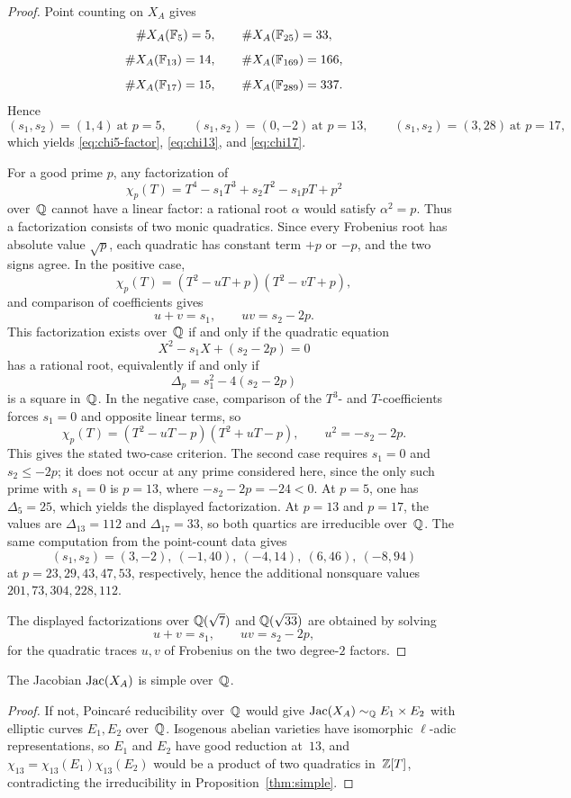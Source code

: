 \begin{proof}
Point counting on \(X_A\) gives
\[
\#X_A(\mathbb{F}_5)=5,\qquad \#X_A(\mathbb{F}_{25})=33,
\]
\[
\#X_A(\mathbb{F}_{13})=14,\qquad \#X_A(\mathbb{F}_{169})=166,
\]
\[
\#X_A(\mathbb{F}_{17})=15,\qquad \#X_A(\mathbb{F}_{289})=337.
\]
Hence
\[
(s_1,s_2)=(1,4)\ \text{at }p=5,\qquad
(s_1,s_2)=(0,-2)\ \text{at }p=13,\qquad
(s_1,s_2)=(3,28)\ \text{at }p=17,
\]
which yields \eqref{eq:chi5-factor}, \eqref{eq:chi13}, and \eqref{eq:chi17}.

For a good prime \(p\), any factorization of
\[
\chi_p(T)=T^4-s_1T^3+s_2T^2-s_1pT+p^2
\]
over~\(\mathbb{Q}\) cannot have a linear factor: a rational root \(\alpha\) would satisfy \(\alpha^2=p\). Thus a factorization consists of two monic quadratics. Since every Frobenius root has absolute value \(\sqrt p\), each quadratic has constant term \(+p\) or \(-p\), and the two signs agree. In the positive case,
\[
\chi_p(T)=(T^2-uT+p)(T^2-vT+p),
\]
and comparison of coefficients gives
\[
u+v=s_1,\qquad uv=s_2-2p.
\]
This factorization exists over~\(\mathbb{Q}\) if and only if the quadratic equation
\[
X^2-s_1X+(s_2-2p)=0
\]
has a rational root, equivalently if and only if
\[
\Delta_p=s_1^2-4(s_2-2p)
\]
is a square in~\(\mathbb{Q}\). In the negative case, comparison of the \(T^3\)- and \(T\)-coefficients forces \(s_1=0\) and opposite linear terms, so
\[
\chi_p(T)=(T^2-uT-p)(T^2+uT-p),\qquad u^2=-s_2-2p.
\]
This gives the stated two-case criterion. The second case requires \(s_1=0\) and \(s_2\leq-2p\); it does not occur at any prime considered here, since the only such prime with \(s_1=0\) is \(p=13\), where \(-s_2-2p=-24<0\). At \(p=5\), one has \(\Delta_5=25\), which yields the displayed factorization. At \(p=13\) and \(p=17\), the values are \(\Delta_{13}=112\) and \(\Delta_{17}=33\), so both quartics are irreducible over~\(\mathbb{Q}\). The same computation from the point-count data gives
\[
(s_1,s_2)=(3,-2),\ (-1,40),\ (-4,14),\ (6,46),\ (-8,94)
\]
at \(p=23,29,43,47,53\), respectively, hence the additional nonsquare values \(201,73,304,228,112\).

The displayed factorizations over \(\mathbb{Q}(\sqrt{7})\) and \(\mathbb{Q}(\sqrt{33})\) are obtained by solving
\[
u+v=s_1,\qquad uv=s_2-2p,
\]
for the quadratic traces \(u,v\) of Frobenius on the two degree-\(2\) factors.
\end{proof}

\begin{corollary}\label{cor:q-simple}
The Jacobian \(\operatorname{Jac}(X_A)\) is simple over~\(\mathbb{Q}\).
\end{corollary}

\begin{proof}
If not, Poincar\'e reducibility over~\(\mathbb{Q}\) would give \(\operatorname{Jac}(X_A)\sim_{\mathbb{Q}}E_1\times E_2\) with elliptic curves \(E_1,E_2\) over~\(\mathbb{Q}\). Isogenous abelian varieties have isomorphic \(\ell\)-adic representations, so \(E_1\) and \(E_2\) have good reduction at~\(13\), and \(\chi_{13}=\chi_{13}(E_1)\chi_{13}(E_2)\) would be a product of two quadratics in~\(\mathbb{Z}[T]\), contradicting the irreducibility in Proposition~\ref{thm:simple}.
\end{proof}

